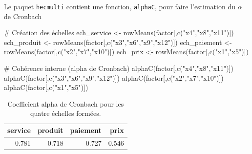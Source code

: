 \documentclass[
  11pt,
  letterpaper,
]{scrbook}
\newenvironment{Shaded}{\begin{snugshade}}{\end{snugshade}}
\newcommand{\CommentTok}[1]{\textcolor[rgb]{0.37,0.37,0.37}{#1}}
\newcommand{\FunctionTok}[1]{\textcolor[rgb]{0.28,0.35,0.67}{#1}}
\newcommand{\NormalTok}[1]{\textcolor[rgb]{0.00,0.23,0.31}{#1}}
\newcommand{\OtherTok}[1]{\textcolor[rgb]{0.00,0.23,0.31}{#1}}
\newcommand{\StringTok}[1]{\textcolor[rgb]{0.13,0.47,0.30}{#1}}
\theoremstyle{definition}
\theoremstyle{remark}
\begin{document}
Le paquet \texttt{hecmulti} contient une fonction, \texttt{alphaC}, pour
faire l'estimation du \(\alpha\) de Cronbach

\begin{Shaded}
\begin{Highlighting}[]
\CommentTok{\# Création des échelles}
\NormalTok{ech\_service }\OtherTok{\textless{}{-}} \FunctionTok{rowMeans}\NormalTok{(factor[,}\FunctionTok{c}\NormalTok{(}\StringTok{"x4"}\NormalTok{,}\StringTok{"x8"}\NormalTok{,}\StringTok{"x11"}\NormalTok{)])}
\NormalTok{ech\_produit }\OtherTok{\textless{}{-}} \FunctionTok{rowMeans}\NormalTok{(factor[,}\FunctionTok{c}\NormalTok{(}\StringTok{"x3"}\NormalTok{,}\StringTok{"x6"}\NormalTok{,}\StringTok{"x9"}\NormalTok{,}\StringTok{"x12"}\NormalTok{)])}
\NormalTok{ech\_paiement }\OtherTok{\textless{}{-}} \FunctionTok{rowMeans}\NormalTok{(factor[,}\FunctionTok{c}\NormalTok{(}\StringTok{"x2"}\NormalTok{,}\StringTok{"x7"}\NormalTok{,}\StringTok{"x10"}\NormalTok{)])}
\NormalTok{ech\_prix }\OtherTok{\textless{}{-}} \FunctionTok{rowMeans}\NormalTok{(factor[,}\FunctionTok{c}\NormalTok{(}\StringTok{"x1"}\NormalTok{,}\StringTok{"x5"}\NormalTok{)])}

\CommentTok{\# Cohérence interne (alpha de Cronbach)}
\FunctionTok{alphaC}\NormalTok{(factor[,}\FunctionTok{c}\NormalTok{(}\StringTok{"x4"}\NormalTok{,}\StringTok{"x8"}\NormalTok{,}\StringTok{"x11"}\NormalTok{)])}
\FunctionTok{alphaC}\NormalTok{(factor[,}\FunctionTok{c}\NormalTok{(}\StringTok{"x3"}\NormalTok{,}\StringTok{"x6"}\NormalTok{,}\StringTok{"x9"}\NormalTok{,}\StringTok{"x12"}\NormalTok{)])}
\FunctionTok{alphaC}\NormalTok{(factor[,}\FunctionTok{c}\NormalTok{(}\StringTok{"x2"}\NormalTok{,}\StringTok{"x7"}\NormalTok{,}\StringTok{"x10"}\NormalTok{)])}
\FunctionTok{alphaC}\NormalTok{(factor[,}\FunctionTok{c}\NormalTok{(}\StringTok{"x1"}\NormalTok{,}\StringTok{"x5"}\NormalTok{)])}
\end{Highlighting}
\end{Shaded}

\hypertarget{tbl-alphaCronbach}{}
\begin{table}
\caption{\label{tbl-alphaCronbach}Coefficient alpha de Cronbach pour les quatre échelles formées. }\tabularnewline

\centering
\begin{tabular}{rrrr}
\toprule
service & produit & paiement & prix\\
\midrule
0.781 & 0.718 & 0.727 & 0.546\\
\bottomrule
\end{tabular}
\end{table}
\end{document}
